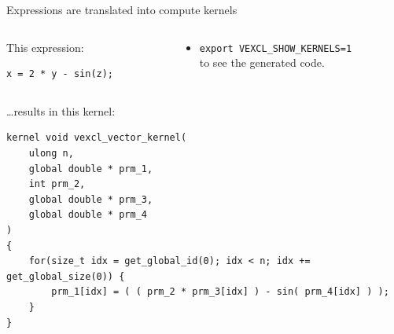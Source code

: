 \documentclass[@BEAMER_OPTIONS@]{beamer}
\newcommand{\code}[1]{\lstinline|#1|}
\begin{document}
\begin{frame}[fragile]{Expressions are translated into compute kernels}
    \begin{columns}
        \begin{column}{0.38\textwidth}
            \begin{exampleblock}{This expression:}
                \begin{lstlisting}
x = 2 * y - sin(z);
                \end{lstlisting}
            \end{exampleblock}
        \end{column}
        \begin{column}{0.55\textwidth}
            \begin{itemize}
                \item \code{export VEXCL_SHOW_KERNELS=1}\\
                    to see the generated code.
            \end{itemize}
        \end{column}
    \end{columns}
    \begin{exampleblock}{\ldots results in this kernel:}
        \begin{lstlisting}
kernel void vexcl_vector_kernel(
    ulong n,
    global double * prm_1,
    int prm_2,
    global double * prm_3,
    global double * prm_4
)
{
    for(size_t idx = get_global_id(0); idx < n; idx += get_global_size(0)) {
        prm_1[idx] = ( ( prm_2 * prm_3[idx] ) - sin( prm_4[idx] ) );
    }
}
        \end{lstlisting}
    \end{exampleblock}
\end{frame}
\end{document}
